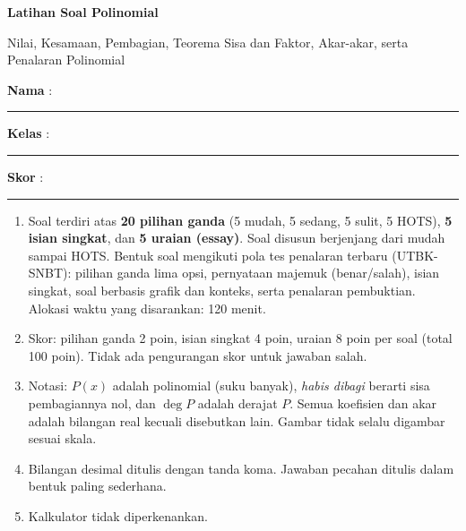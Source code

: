 \documentclass[a4paper,11pt]{article}
\newcounter{no}
\begin{document}
\thispagestyle{fancy}

\begin{center}
  {\color{redx}\fontsize{22}{26}\selectfont\bfseries Latihan Soal Polinomial\par}
  \vspace{2pt}
  {\color{pinkx}\large Nilai, Kesamaan, Pembagian, Teorema Sisa dan Faktor, Akar-akar, serta Penalaran Polinomial\par}
\end{center}
\vspace{2pt}
\begin{tcolorbox}[colback=softbg,colframe=redx!40,boxrule=0.6pt,arc=3pt,left=8pt,right=8pt,top=5pt,bottom=5pt]
\noindent\textbf{Nama} : \rule{4.6cm}{0.4pt}\hfill\textbf{Kelas} : \rule{2.2cm}{0.4pt}\hfill\textbf{Skor} : \rule{2.2cm}{0.4pt}
\end{tcolorbox}
\vspace{2pt}
\begin{tcolorbox}[colback=white,colframe=pinkx,boxrule=0.8pt,arc=3pt,left=8pt,right=8pt,top=4pt,bottom=4pt,title={\bfseries Petunjuk Pengerjaan},coltitle=white,fonttitle=\small]
\small
\begin{enumerate}[leftmargin=1.4em,itemsep=1pt,topsep=1pt]
\item Soal terdiri atas \textbf{20 pilihan ganda} (5 mudah, 5 sedang, 5 sulit, 5 HOTS), \textbf{5 isian singkat}, dan \textbf{5 uraian (essay)}. Soal disusun berjenjang dari mudah sampai HOTS. Bentuk soal mengikuti pola tes penalaran terbaru (UTBK-SNBT): pilihan ganda lima opsi, pernyataan majemuk (benar/salah), isian singkat, soal berbasis grafik dan konteks, serta penalaran pembuktian. Alokasi waktu yang disarankan: 120 menit.
\item Skor: pilihan ganda 2 poin, isian singkat 4 poin, uraian 8 poin per soal (total 100 poin). Tidak ada pengurangan skor untuk jawaban salah.
\item Notasi: $P(x)$ adalah polinomial (suku banyak), \textit{habis dibagi} berarti sisa pembagiannya nol, dan $\deg P$ adalah derajat $P$. Semua koefisien dan akar adalah bilangan real kecuali disebutkan lain. Gambar tidak selalu digambar sesuai skala.
\item Bilangan desimal ditulis dengan tanda koma. Jawaban pecahan ditulis dalam bentuk paling sederhana.
\item Kalkulator tidak diperkenankan.
\end{enumerate}
\end{tcolorbox}
\end{document}
